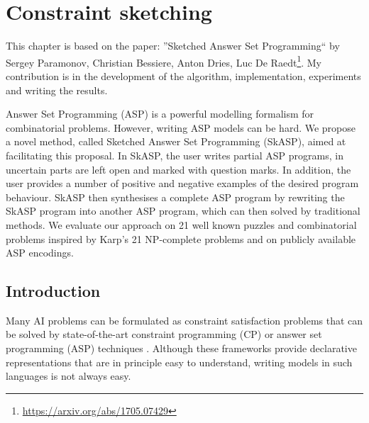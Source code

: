 \chapter{Constraint sketching} \label{ch:sketching}
This chapter is based on the paper: ''Sketched Answer Set Programming`` by Sergey Paramonov, Christian Bessiere, Anton Dries, Luc De Raedt\footnote{\url{https://arxiv.org/abs/1705.07429}}. My contribution is in the development of the algorithm, implementation, experiments and writing the results.


Answer Set Programming (ASP) is a powerful modelling formalism for combinatorial problems. However, writing ASP models can be hard. We propose a novel method, called Sketched Answer Set Programming (SkASP), aimed at facilitating this proposal. In SkASP, the user writes partial ASP programs, in uncertain parts are left open and marked with question marks. In addition, the user provides a number of positive and negative examples of the desired program behaviour. SkASP then synthesises a complete ASP program by rewriting the SkASP program into another ASP program, which can then solved by traditional methods. We evaluate our approach on 21 well known puzzles and combinatorial problems inspired by Karp’s 21 NP-complete problems and on publicly available ASP encodings.

\newcommand{\addedsket}[1]{#1\xspace}

\section{Introduction}\label{sec:intro}
Many AI problems can be formulated as constraint satisfaction problems that can
be solved by state-of-the-art constraint programming (CP)  \parencite{handbookcp} or answer set programming (ASP) techniques \parencite{whatisasp}. 
Although these frameworks provide declarative representations that are in principle
easy to understand, writing models in such languages is not always easy.


